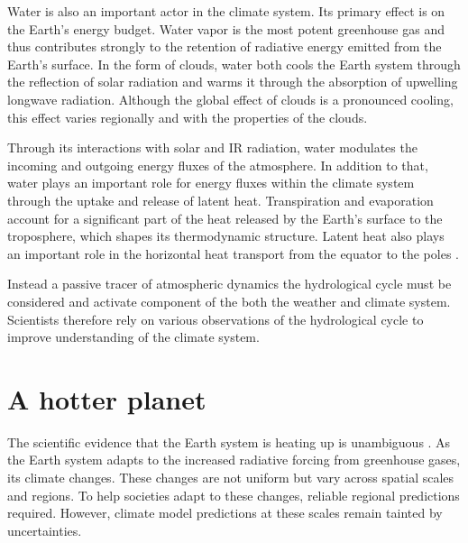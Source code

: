 
Water is also an important actor in the climate system. Its primary effect is on
the Earth's energy budget. Water vapor is the most potent greenhouse gas and
thus contributes strongly to the retention of radiative energy emitted from the
Earth's surface. In the form of clouds, water both cools the Earth system
through the reflection of solar radiation and warms it through the absorption of
upwelling longwave radiation. Although the global effect of clouds is a
pronounced cooling, this effect varies regionally and with the properties of the
clouds.

Through its interactions with solar and IR radiation, water modulates
the incoming and outgoing energy fluxes of the atmosphere. In addition to that,
water plays an important role for energy fluxes within the climate system
through the uptake and release of latent heat. Transpiration and evaporation
account for a significant part of the heat released by the Earth's surface to
the troposphere, which shapes its thermodynamic structure. Latent heat also
plays an important role in the horizontal heat transport from the equator
to the poles \citep{stevens13}.

Instead a passive tracer of atmospheric dynamics the hydrological cycle must be
considered and activate component of the both the weather and climate system.
Scientists therefore rely on various observations of the hydrological cycle to
improve understanding of the climate system.


\section{A hotter planet}

The scientific evidence that the Earth system is heating up is
unambiguous \citep{ipcc21}. As the Earth system adapts to the increased
radiative forcing from greenhouse gases, its climate changes. These changes are
not uniform but vary across spatial scales and regions. To help societies adapt
to these changes, reliable regional predictions required. However, climate model
predictions at these scales remain tainted by uncertainties.

